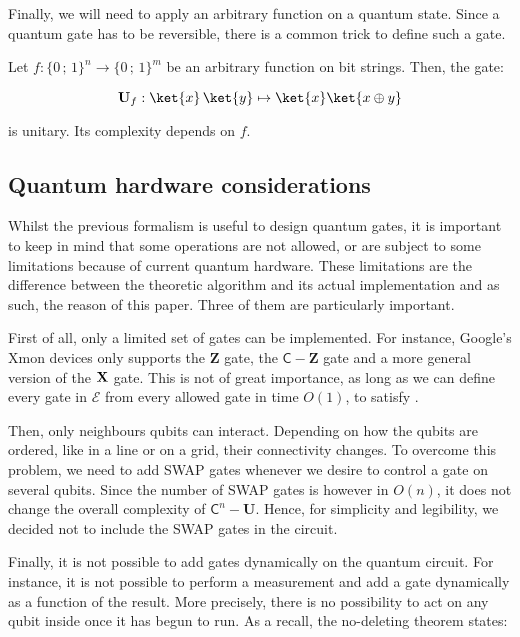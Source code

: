 \documentclass[11pt, a4paper]{article}
\begin{document}
                Finally, we will need to apply an arbitrary function on a quantum state. Since a quantum gate has to be reversible, there is a common trick to define such a gate.
                
                \begin{definition}
                    Let \(f:\{0\,;\,1\}^n\to\{0\,;\,1\}^m\) be an arbitrary function on bit strings. Then, the gate:
                    
                    \[\mathbf{U}_f:\ket{x}\,\ket{y}\mapsto\ket{x}\ket{x\oplus y}\]
                    
                    is unitary. Its complexity depends on \(f\).
                \end{definition}

        \subsection{Quantum hardware considerations}
            \label{subsec:Hardware}
            Whilst the previous formalism is useful to design quantum gates, it is important to keep in mind that some operations are not allowed, or are subject to some limitations because of current quantum hardware. These limitations are the difference between the theoretic algorithm and its actual implementation and as such, the reason of this paper. Three of them are particularly important.
            
            First of all, only a limited set of gates can be implemented. For instance, Google’s Xmon devices only supports the \(\mathbf{Z}\) gate, the \(\mathsf{C}-\mathbf{Z}\) gate and a more general version of the \(\mathbf{X}\) gate. This is not of great importance, as long as we can define every gate in \(\mathcal{E}\) from every allowed gate in time \(O(1)\), to satisfy .
            
            Then, only neighbours qubits can interact. Depending on how the qubits are ordered, like in a line or on a grid, their connectivity changes. To overcome this problem, we need to add SWAP gates whenever we desire to control a gate on several qubits. Since the number of SWAP gates is however in \(O(n)\), it does not change the overall complexity of \(\mathsf{C}^n-\mathbf{U}\). Hence, for simplicity and legibility, we decided not to include the SWAP gates in the circuit.
            
            Finally, it is not possible to add gates dynamically on the quantum circuit. For instance, it is not possible to perform a measurement and add a gate dynamically as a function of the result. More precisely, there is no possibility to act on any qubit inside once it has begun to run. As a recall, the no-deleting theorem states:
            
\end{document}
